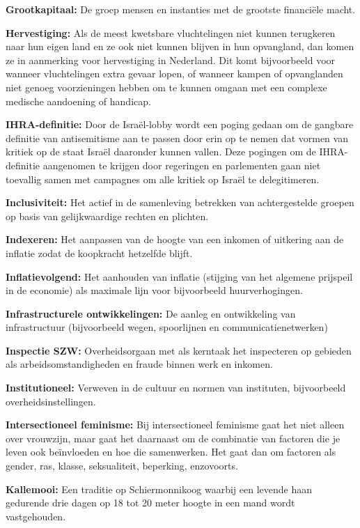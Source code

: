 \textbf{Grootkapitaal:} De groep mensen en instanties met de grootste
financiële macht.

\textbf{Hervestiging:} Als de meest kwetsbare vluchtelingen niet kunnen
terugkeren naar hun eigen land en ze ook niet kunnen blijven in hun
opvangland, dan komen ze in aanmerking voor hervestiging in Nederland.
Dit komt bijvoorbeeld voor wanneer vluchtelingen extra gevaar lopen, of
wanneer kampen of opvanglanden niet genoeg voorzieningen hebben om te
kunnen omgaan met een complexe medische aandoening of handicap.

\textbf{IHRA-definitie:} Door de Israël-lobby wordt een poging gedaan om
de gangbare definitie van antisemitisme aan te passen door erin op te
nemen dat vormen van kritiek op de staat Israël daaronder kunnen vallen.
Deze pogingen om de IHRA-definitie aangenomen te krijgen door regeringen
en parlementen gaan niet toevallig samen met campagnes om alle kritiek
op Israël te delegitimeren.

\textbf{Inclusiviteit:} Het actief in de samenleving betrekken van
achtergestelde groepen op basis van gelijkwaardige rechten en plichten.

\textbf{Indexeren:} Het aanpassen van de hoogte van een inkomen of
uitkering aan de inflatie zodat de koopkracht hetzelfde blijft.

\textbf{Inflatievolgend:} Het aanhouden van inflatie (stijging van het
algemene prijspeil in de economie) als maximale lijn voor bijvoorbeeld
huurverhogingen.

\textbf{Infrastructurele ontwikkelingen:} De aanleg en ontwikkeling van
infrastructuur (bijvoorbeeld wegen, spoorlijnen en
communicatienetwerken)

\textbf{Inspectie SZW:} Overheidsorgaan met als kerntaak het inspecteren
op gebieden als arbeidsomstandigheden en fraude binnen werk en inkomen.

\textbf{Institutioneel:} Verweven in de cultuur en normen van
instituten, bijvoorbeeld overheidsinstellingen.

\textbf{Intersectioneel feminisme:} Bij intersectioneel feminisme gaat
het niet alleen over vrouwzijn, maar gaat het daarnaast om de combinatie
van factoren die je leven ook beïnvloeden en hoe die samenwerken. Het
gaat dan om factoren als gender, ras, klasse, seksualiteit, beperking,
enzovoorts.

\textbf{Kallemooi:} Een traditie op Schiermonnikoog waarbij een levende
haan gedurende drie dagen op 18 tot 20 meter hoogte in een mand wordt
vastgehouden.

